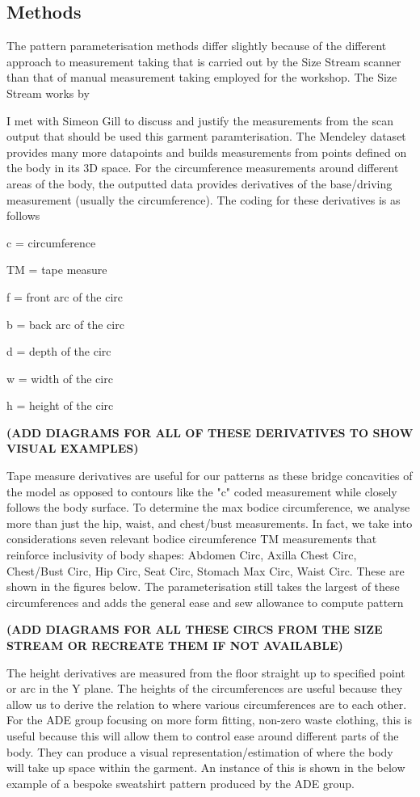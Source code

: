 \subsection{Methods}
The pattern parameterisation methods differ slightly because of the different approach to measurement taking that is carried out by the Size Stream scanner than that of manual measurement taking employed for the workshop. The Size Stream works by

I met with Simeon Gill to discuss and justify the measurements from the scan output that should be used this garment paramterisation. The Mendeley dataset provides many more datapoints and builds measurements from points defined on the body in its 3D space. For the circumference measurements around different areas of the body, the outputted data provides derivatives of the base/driving measurement (usually the circumference). The coding for these derivatives is as follows

c = circumference

TM = tape measure

f = front arc of the circ

b = back arc of the circ

d = depth of the circ

w = width of the circ

h = height of the circ

\textbf{(ADD DIAGRAMS FOR ALL OF THESE DERIVATIVES TO SHOW VISUAL EXAMPLES)}

Tape measure derivatives are useful for our patterns as these bridge concavities of the model as opposed to contours like the "c" coded measurement while closely follows the body surface. To determine the max bodice circumference, we analyse more than just the hip, waist, and chest/bust measurements. In fact, we take into considerations seven relevant bodice circumference TM measurements that reinforce inclusivity of body shapes: Abdomen Circ, Axilla Chest Circ, Chest/Bust Circ, Hip Circ, Seat Circ, Stomach Max Circ, Waist Circ. These are shown in the figures below. The parameterisation still takes the largest of these circumferences and adds the general ease and sew allowance to compute pattern 

\textbf{(ADD DIAGRAMS FOR ALL THESE CIRCS FROM THE SIZE STREAM OR RECREATE THEM IF NOT AVAILABLE)}

The height derivatives are measured from the floor straight up to specified point or arc in the Y plane. The heights of the circumferences are useful because they allow us to derive the relation to where various circumferences are to each other. For the ADE group focusing on more form fitting, non-zero waste clothing, this is useful because this will allow them to control ease around different parts of the body. They can produce a visual representation/estimation of where the body will take up space within the garment. An instance of this is shown in the below example of a bespoke sweatshirt pattern produced by the ADE group. 

